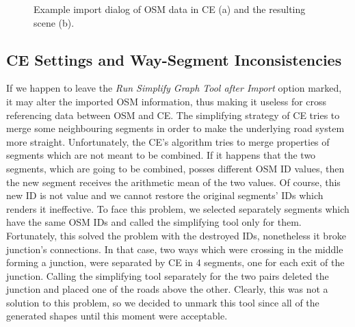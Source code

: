 \begin{figure}[htb]
	\centering
	\caption{Example import dialog of OSM data in CE (a) and the resulting scene (b).}
\end{figure}

\subsection{CE Settings and Way-Segment Inconsistencies}
If we happen to leave the \emph{Run Simplify Graph Tool after Import} option marked, it may alter the imported OSM information, thus making it useless for cross referencing data between OSM and CE. The simplifying strategy of CE tries to merge some neighbouring segments in order to make the underlying road system more straight. Unfortunately, the CE's algorithm tries to merge properties of segments which are not meant to be combined. If it happens that the two segments, which are going to be combined, posses different OSM ID values, then the new segment receives the arithmetic mean of the two values. Of course, this new ID is not value and we cannot restore the original segments' IDs which renders it ineffective. To face this problem, we selected separately segments which have the same OSM IDs and called the simplifying tool only for them. Fortunately, this solved the problem with the destroyed IDs, nonetheless it broke junction's connections. In that case, two ways which were crossing in the middle forming a junction, were separated by CE in 4 segments, one for each exit of the junction. Calling the simplifying tool separately for the two pairs deleted the junction and placed one of the roads above the other. Clearly, this was not a solution to this problem, so we decided to unmark this tool since all of the generated shapes until this moment were acceptable.  

